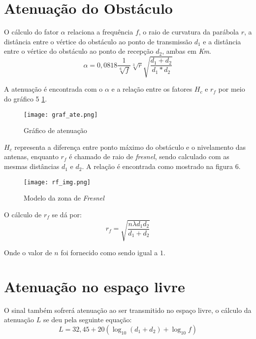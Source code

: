\section{Atenuação do Obstáculo}
O cálculo do fator $\alpha$ relaciona a frequência $f$, o raio de curvatura da parábola $r$, a distância entre o vértice do obstáculo ao ponto de transmissão $d_1$ e a distância entre o vértice do obstáculo ao ponto de recepção $d_2$, ambas em \textit{Km}.
\begin{equation}
\alpha = 0,0818\dfrac{1}{\sqrt[6]{f}}\sqrt[3]{r}\sqrt{\dfrac{d_1+d_2}{d_1*d_2}}
\end{equation}

A atenuação é encontrada com o $\alpha$ e a relação entre os fatores  $H_c$ e $r_f$ por meio do gráfico 5 \ref{fig:graf_ate}.

\begin{figure}[h]
	\centering
	\texttt{[image: graf\_ate.png]}
	\label{fig:graf_ate}
	\caption{Gráfico de atenuação}
\end{figure} 

$H_c$ representa a diferença entre ponto máximo do obstáculo e o nivelamento das antenas, enquanto $r_f$  é chamado de raio de \textit{fresnel}, sendo calculado com as mesmas distâncias $d_1$ e $d_2$. A relação é encontrada como mostrado na figura 6.

\begin{figure}[h]
	\centering
	\texttt{[image: rf\_img.png]}
	\label{fig:rf_img}
	\caption{Modelo da zona de \textit{Fresnel}}
\end{figure}

O cálculo de $r_f$ se dá por:
\begin{equation}
r_f = \sqrt{\dfrac{n\lambda d_1 d_2}{d_1 + d_2}}
\end{equation}

Onde o valor de $n$ foi fornecido como sendo igual a $1$.

\section{Atenuação no espaço livre}

O sinal também sofrerá atenuação ao ser transmitido no espaço livre, o cálculo da atenuação $L$ se deu pela seguinte equação:
\begin{equation}
L = 32,45 +20(\log_{10}(d_1+d_2) + \log_{10}f)
\end{equation}




